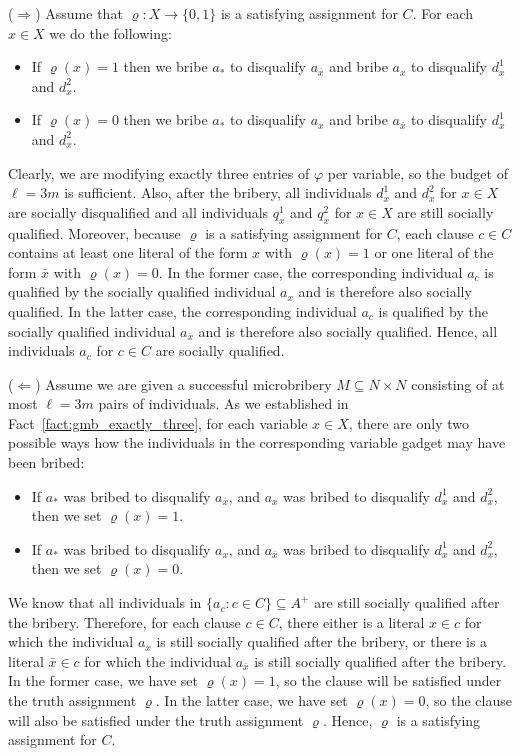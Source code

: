 \documentclass[
    12pt,               %
    a4paper,            %
    bibtotoc,           %
    pointlessnumbers,   %
    ngerman,            %
    titlepage,          %
    leqno,              %
    ]{scrarticle}       %
\newcommand\factref{Fact~\ref}
\begin{document}
\begin{Proof}
($\Rightarrow$) Assume that $\varrho : X \rightarrow \{0, 1\}$ is a satisfying assignment for $C$. For each $x \in X$ we do the following:
\begin{itemize}[nolistsep, topsep=-1.25em]
\item
If $\varrho(x) = 1$ then we bribe $a_\ast$ to disqualify $a_{\bar{x}}$ and bribe $a_x$ to disqualify $d_x^1$ and $d_x^2$.
\item
If $\varrho(x) = 0$ then we bribe $a_\ast$ to disqualify $a_x$ and bribe $a_{\bar{x}}$ to disqualify $d_x^1$ and $d_x^2$.
\end{itemize}
Clearly, we are modifying exactly three entries of $\varphi$ per variable, so the budget of $\ell = 3m$ is sufficient. Also, after the bribery, all individuals $d_x^1$ and $d_x^2$ for $x \in X$ are socially disqualified and all individuals $q_x^1$ and $q_x^2$ for $x \in X$ are still socially qualified. Moreover, because $\varrho$ is a satisfying assignment for $C$, each clause $c \in C$ contains at least one literal of the form $x$ with $\varrho(x) = 1$ or one literal of the form $\bar{x}$ with $\varrho(x) = 0$. In the former case, the corresponding individual $a_c$ is qualified by the socially qualified individual $a_x$ and is therefore also socially qualified. In the latter case, the corresponding individual $a_c$ is qualified by the socially qualified individual $a_{\bar{x}}$ and is therefore also socially qualified. Hence, all individuals $a_c$ for $c \in C$ are socially qualified.

($\Leftarrow$) Assume we are given a successful microbribery $M \subseteq N \times N$ consisting of at most $\ell = 3m$ pairs of individuals. As we established in \factref{fact:gmb_exactly_three}, for each variable $x \in X$, there are only two possible ways how the individuals in the corresponding variable gadget may have been bribed:
\begin{itemize}[nolistsep, topsep=-1.25em]
\item
If $a_\ast$ was bribed to disqualify $a_{\bar{x}}$, and $a_x$ was bribed to disqualify $d_x^1$ and $d_x^2$, then we set $\varrho(x) = 1$.
\item
If $a_\ast$ was bribed to disqualify $a_x$, and $a_{\bar{x}}$ was bribed to disqualify $d_x^1$ and $d_x^2$, then we set $\varrho(x) = 0$.
\end{itemize}
We know that all individuals in $\{ a_c : c \in C \} \subseteq A^+$ are still socially qualified after the bribery. Therefore, for each clause $c \in C$, there either is a literal $x \in c$ for which the individual $a_x$ is still socially qualified after the bribery, or there is a literal $\bar{x} \in c$ for which the individual $a_{\bar{x}}$ is still socially qualified after the bribery. In the former case, we have set $\varrho(x) = 1$, so the clause will be satisfied under the truth assignment $\varrho$. In the latter case, we have set $\varrho(x) = 0$, so the clause will also be satisfied under the truth assignment $\varrho$. Hence, $\varrho$ is a satisfying assignment for $C$.
\end{Proof}
\end{document}
